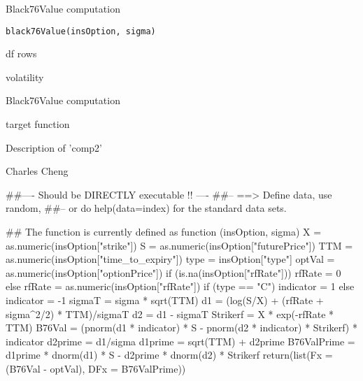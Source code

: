 \documentclass[a4paper]{book}
\begin{document}
%
\begin{Description}\relax
Black76Value computation
\end{Description}
%
\begin{Usage}
\begin{verbatim}
black76Value(insOption, sigma)
\end{verbatim}
\end{Usage}
%
\begin{Arguments}
\begin{ldescription}
\item[\code{insOption}] df rows
\item[\code{sigma}]  volatility
\end{ldescription}
\end{Arguments}
%
\begin{Details}\relax
Black76Value computation
\end{Details}
%
\begin{Value}
\begin{ldescription}
\item[\code{Fx }] target function
\item[\code{comp2 }] Description of 'comp2'
\end{ldescription}
\end{Value}
%
\begin{Author}\relax
Charles Cheng
\end{Author}
%
\begin{Examples}
\begin{ExampleCode}
##---- Should be DIRECTLY executable !! ----
##-- ==>  Define data, use random,
##--	or do  help(data=index)  for the standard data sets.

## The function is currently defined as
function (insOption, sigma) 
{
    X = as.numeric(insOption["strike"])
    S = as.numeric(insOption["futurePrice"])
    TTM = as.numeric(insOption["time_to_expiry"])
    type = insOption["type"]
    optVal = as.numeric(insOption["optionPrice"])
    if (is.na(insOption["rfRate"])) {
        rfRate = 0
    }
    else {
        rfRate = as.numeric(insOption["rfRate"])
    }
    if (type == "C") {
        indicator = 1
    }
    else {
        indicator = -1
    }
    sigmaT = sigma * sqrt(TTM)
    d1 = (log(S/X) + (rfRate + sigma^2/2) * TTM)/sigmaT
    d2 = d1 - sigmaT
    Strikerf = X * exp(-rfRate * TTM)
    B76Val = (pnorm(d1 * indicator) * S - pnorm(d2 * indicator) * 
        Strikerf) * indicator
    d2prime = d1/sigma
    d1prime = sqrt(TTM) + d2prime
    B76ValPrime = d1prime * dnorm(d1) * S - d2prime * dnorm(d2) * 
        Strikerf
    return(list(Fx = (B76Val - optVal), DFx = B76ValPrime))
  }
\end{ExampleCode}
\end{Examples}
\end{document}
